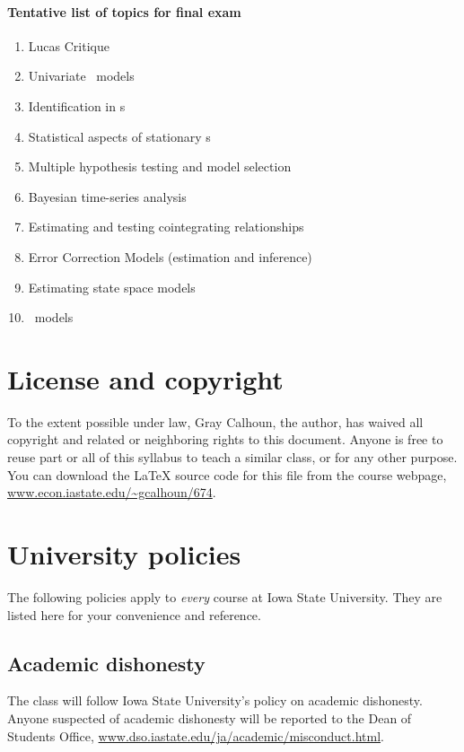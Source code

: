 \documentclass[nofonts,nols]{tufte-handout}
\begin{document}
\paragraph{Tentative list of topics for final exam}
\begin{enumerate}
\item Lucas Critique
\item Univariate \ARMA\ models
\item Identification in \SVAR s
\item Statistical aspects of stationary \VAR s
\item Multiple hypothesis testing and model selection
\item Bayesian time-series analysis
\item Estimating and testing cointegrating relationships
\item Error Correction Models (estimation and inference)
\item Estimating state space models
\item \DSGE\ models
\end{enumerate}

\section{License and copyright}
To the extent possible under law, Gray Calhoun, the author, has waived
all copyright and related or neighboring rights to this
document. Anyone is free to reuse part or all of this syllabus to
teach a similar class, or for any other purpose. You can download the
LaTeX source code for this file from the course webpage,
\url{www.econ.iastate.edu/~gcalhoun/674}.

\section{University policies}

The following policies apply to \emph{every} course at Iowa State
University. They are listed here for your convenience and reference.

\subsection*{Academic dishonesty}

The class will follow Iowa State University's policy on academic
dishonesty.  Anyone suspected of academic dishonesty will be reported
to the Dean of Students Office,
\url{www.dso.iastate.edu/ja/academic/misconduct.html}.
\end{document}
